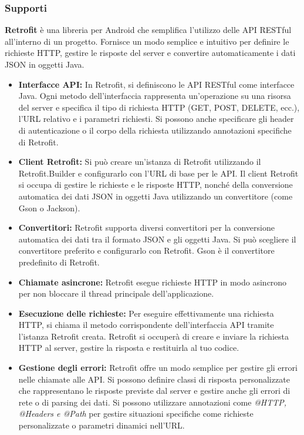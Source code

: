 \documentclass{article}
\begin{document}
		\subsubsection{Supporti}
		\textbf{Retrofit} è una libreria per Android che semplifica l'utilizzo delle API RESTful all'interno di un progetto. Fornisce un modo semplice e intuitivo per definire le richieste HTTP, gestire le risposte del server e convertire automaticamente i dati JSON in oggetti Java.
		\begin{itemize}
			\item \textbf{Interfacce API:} In Retrofit, si definiscono le API RESTful come interfacce Java. Ogni metodo dell'interfaccia rappresenta un'operazione su una risorsa del server e specifica il tipo di richiesta HTTP (GET, POST, DELETE, ecc.), l'URL relativo e i parametri richiesti. Si possono anche specificare gli header di autenticazione o il corpo della richiesta utilizzando annotazioni specifiche di Retrofit.
			\item \textbf{Client Retrofit:} Si può creare un'istanza di Retrofit utilizzando il Retrofit.Builder e configurarlo con l'URL di base per le API. Il client Retrofit si occupa di gestire le richieste e le risposte HTTP, nonché della conversione automatica dei dati JSON in oggetti Java utilizzando un convertitore (come Gson o Jackson).
			\item \textbf{Convertitori:} Retrofit supporta diversi convertitori per la conversione automatica dei dati tra il formato JSON e gli oggetti Java. Si può scegliere il convertitore preferito e configurarlo con Retrofit. Gson è il convertitore predefinito di Retrofit.
			\item \textbf{Chiamate asincrone:} Retrofit esegue richieste HTTP in modo asincrono per non bloccare il thread principale dell'applicazione.
			\item \textbf{Esecuzione delle richieste:} Per eseguire effettivamente una richiesta HTTP, si chiama il metodo corrispondente dell'interfaccia API tramite l'istanza Retrofit creata. Retrofit si occuperà di creare e inviare la richiesta HTTP al server, gestire la risposta e restituirla al tuo codice.
			\item \textbf{Gestione degli errori:} Retrofit offre un modo semplice per gestire gli errori nelle chiamate alle API. Si possono definire classi di risposta personalizzate che rappresentano le risposte previste dal server e gestire anche gli errori di rete o di parsing dei dati. Si possono utilizzare annotazioni come \textit{@HTTP, @Headers e @Path} per gestire situazioni specifiche come richieste personalizzate o parametri dinamici nell'URL.
		\end{itemize}
\end{document}
